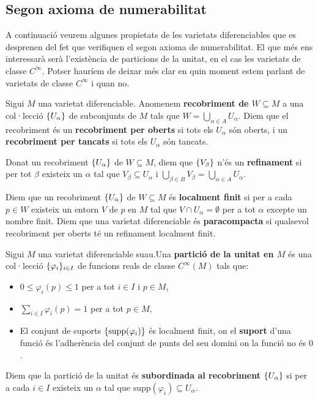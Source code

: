 \subsection{Segon axioma de numerabilitat}
A continuació veurem algunes propietats de les varietats diferenciables que es desprenen del fet que verifiquen el segon axioma de numerabilitat. El que més ens interessarà serà l'existència de particions de la unitat, en el cas les varietats de classe $C^\infty$.{\color{blue} Potser hauríem de deixar més clar en quin moment estem parlant de varietats de classe $C^\infty$ i quan no.}

\begin{defi}
    Sigui $M$ una varietat diferenciable. Anomenem \textbf{recobriment de $W\subseteq M$} a una col·lecció $\{U_\alpha\}$ de subconjunts de $M$ tals que $W = \bigcup_{\alpha\in A} U_\alpha$. Diem que el recobriment és un \textbf{recobriment per oberts} si tots els $U_\alpha$ són oberts, i un \textbf{recobriment per tancats} si tots els $U_\alpha$ són tancats.

    Donat un recobriment $\{U_\alpha\}$ de $W\subseteq M$, diem que $\{V_\beta\}$ n'és un \textbf{refinament} si per tot $\beta$ existeix un $\alpha$ tal que $V_\beta\subseteq U_\alpha$ i $\bigcup_{\beta\in B} V_\beta = \bigcup_{\alpha\in A} U_\alpha$.

    Diem que un recobriment $\{U_\alpha\}$ de $W\subseteq M$ és \textbf{localment finit} si per a cada $p\in W$ existeix un entorn $V$ de $p$ en $M$ tal que $V\cap U_\alpha = \emptyset$ per a tot $\alpha$ excepte un nombre finit. Diem que una varietat diferenciable és \textbf{paracompacta} si qualsevol recobriment per oberts té un refinament localment finit.
\end{defi}

\begin{defi}
    Sigui $M$ una varietat diferenciable suau.Una \textbf{partició de la unitat en $M$} és una col·lecció $\{\varphi_i\}_{i\in I}$ de funcions reals de classe $C^\infty(M)$ tals que:
    \begin{itemize}
        \item $0\leq\varphi_i(p)\leq 1$ per a tot $i\in I$ i $p\in M$,
        \item $\sum_{i\in I}\varphi_i(p) = 1$ per a tot $p\in M$,
        \item El conjunt de suports $\{\text{supp}(\varphi_i)\}$ és localment finit, on el \textbf{suport} d'una funció és l'adherència del conjunt de punts del seu domini on la funció no és $0$.
    \end{itemize}
    Diem que la partició de la unitat és \textbf{subordinada al recobriment} $\{U_\alpha\}$ si per a cada $i\in I$ existeix un $\alpha$ tal que $\text{supp}(\varphi_i)\subseteq U_\alpha$.
\end{defi}

